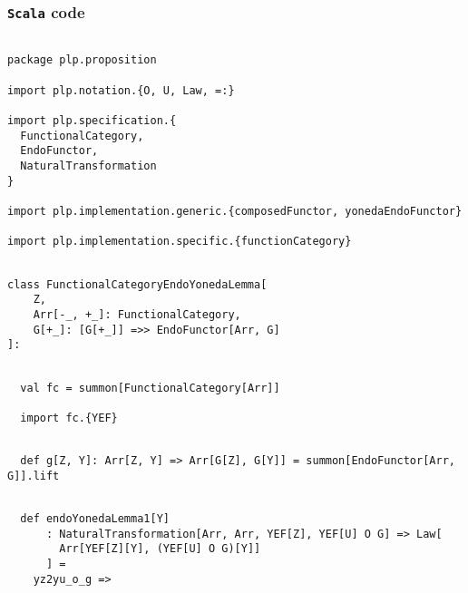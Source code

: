 \documentclass[11pt]{article}
\newcommand{\code}{\subsubsection{{\tt Scala} code}\begingroup\rm \vspace{12pt}}
\begin{document}
\code
\begin{mdframed}[backgroundcolor=lightgray!20] 
\begin{lstlisting}

package plp.proposition

import plp.notation.{O, U, Law, =:}

import plp.specification.{
  FunctionalCategory,
  EndoFunctor,
  NaturalTransformation
}

import plp.implementation.generic.{composedFunctor, yonedaEndoFunctor}

import plp.implementation.specific.{functionCategory}
\end{lstlisting}
\end{mdframed}
\vspace{6pt}
\begin{mdframed}[backgroundcolor=lightgray!20] 
\begin{lstlisting}

class FunctionalCategoryEndoYonedaLemma[
    Z,
    Arr[-_, +_]: FunctionalCategory,
    G[+_]: [G[+_]] =>> EndoFunctor[Arr, G]
]:
\end{lstlisting}
\end{mdframed}
\vspace{6pt}
\begin{mdframed}[backgroundcolor=lightgray!20] 
\begin{lstlisting}

  val fc = summon[FunctionalCategory[Arr]]

  import fc.{YEF}
\end{lstlisting}
\end{mdframed}
\vspace{6pt}
\begin{mdframed}[backgroundcolor=lightgray!20] 
\begin{lstlisting}

  def g[Z, Y]: Arr[Z, Y] => Arr[G[Z], G[Y]] = summon[EndoFunctor[Arr, G]].lift
\end{lstlisting}
\end{mdframed}
\vspace{6pt}
\begin{mdframed}[backgroundcolor=lightgray!20] 
\begin{lstlisting}

  def endoYonedaLemma1[Y]
      : NaturalTransformation[Arr, Arr, YEF[Z], YEF[U] O G] => Law[
        Arr[YEF[Z][Y], (YEF[U] O G)[Y]]
      ] =
    yz2yu_o_g =>
\end{lstlisting}
\end{mdframed}
\end{document}
